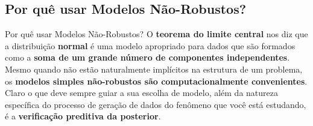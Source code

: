 \subsection{Por quê usar Modelos Não-Robustos?}
\begin{frame}{Por quê usar Modelos Não-Robustos?}
    O \textbf{teorema do limite central} nos diz que a distribuição \textbf{normal}
    é uma modelo apropriado para dados que são formados como a \textbf{soma de um grande número
    de componentes independentes}.
    \vfill
    Mesmo quando não estão naturalmente implícitos na estrutura de um problema,
    os \textbf{modelos simples não-robustos são computacionalmente convenientes}.
    \vfill
    Claro o que deve sempre guiar a sua escolha de modelo, além da natureza específica
    do processo de geração de dados do fenômeno que você está estudando, é
    a \textbf{verificação preditiva da posterior}.
\end{frame}
